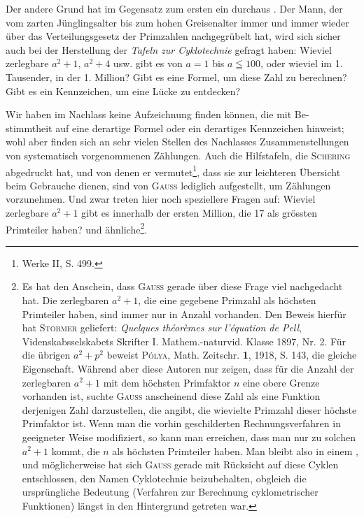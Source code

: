 Der andere Grund hat im Gegensatz zum ersten ein durchaus . Der Mann, der vom zarten Jünglingsalter bis zum
hohen Greisenalter immer und immer wieder über das Verteilungsgesetz der
Primzahlen nachgegrübelt hat, wird sich sicher auch bei der Herstellung der
\textit{Tafeln zur Cyklotechnie} gefragt haben: Wieviel zerlegbare $a^2+1$, $a^2+4$ usw.
gibt es von $a=1$ bis $a\leqq100$, oder wieviel im 1. Tausender, in der 1. Million?
Gibt es eine Formel, um diese Zahl zu berechnen? Gibt es ein Kennzeichen,
um eine Lücke zu entdecken?

Wir haben im Nachlass keine Aufzeichnung finden können, die mit Be-\clearpage{}
\setcounter{footnote}{0}
\noindent stimmtheit auf eine derartige Formel oder ein derartiges Kennzeichen hinweist;
wohl aber finden sich an sehr vielen Stellen des Nachlasses Zusammenstellungen
von systematisch vorgenommenen Zählungen. Auch die Hilfstafeln, die \textsc{Schering}
abgedruckt hat, und von denen er vermutet\footnote{Werke II, S. 499.}, dass sie zur leichteren Übersicht beim Gebrauche dienen, sind von \textsc{Gauss} lediglich aufgestellt, um
Zählungen vorzunehmen. Und zwar treten hier noch speziellere Fragen auf:
Wieviel zerlegbare $a^2+1$ gibt es innerhalb der ersten Million, die 17 als
grössten Primteiler haben? und ähnliche\footnote{Es hat den Anschein, dass \textsc{Gauss} gerade über diese Frage viel nachgedacht hat. Die zerlegbaren
$a^2+1$, die eine gegebene Primzahl als höchsten Primteiler haben, sind immer nur in  Anzahl
vorhanden. Den Beweis hierfür hat \textsc{Störmer} geliefert: \textit{Quelques théorèmes sur l’équation de Pell}, Videnskabsselskabets Skrifter I. Mathem.-naturvid. Klasse 1897, Nr. 2. Für die übrigen $a^2+p^2$ beweist \textsc{Pólya},
Math. Zeitschr. \textbf{1}, 1918, S. 143, die gleiche Eigenschaft. Während aber diese Autoren nur zeigen, dass
für die Anzahl der zerlegbaren $a^2+1$ mit dem höchsten Primfaktor $n$ eine obere Grenze vorhanden ist,
suchte \textsc{Gauss} anscheinend diese Zahl als eine Funktion derjenigen Zahl darzustellen, die angibt, die wievielte Primzahl dieser höchste Primfaktor ist. Wenn man die vorhin geschilderten Rechnungsverfahren in
geeigneter Weise modifiziert, so kann man erreichen, dass man nur zu solchen $a^2+1$ kommt, die $n$
als höchsten Primteiler haben. Man bleibt also in einem , und möglicherweise hat sich \textsc{Gauss}
gerade mit Rücksicht auf diese Cyklen entschlossen, den Namen Cyklotechnie beizubehalten, obgleich die
ursprüngliche Bedeutung (Verfahren zur Berechnung cyklometrischer Funktionen) längst in den Hintergrund
getreten war.}.


